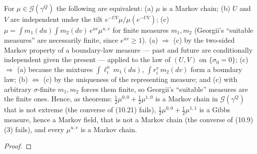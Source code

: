 \begin{corollary}[Georgii (11.33)]
    \label{cor:sc-11-33}
    \leanok

    For $\mu \in \mathcal G(\gamma^Q)$ the following are equivalent: (a) $\mu$ is a Markov chain;
    (b) $U$ and $V$ are independent under the tilt $e^{-UV}\mu/\mu(e^{-UV})$; (c)
    $\mu = \int m_1(du)\int m_2(dv)\,e^{uv}\mu^{u,v}$ for finite measures $m_1, m_2$ (Georgii's
    ``suitable measures'' are necessarily finite, since $e^{uv} \geq 1$). (a) $\Rightarrow$ (c) by
    the two-sided Markov property of a boundary-law measure --- past and future are conditionally
    independent given the present --- applied to the law of $(U,V)$ on $\{\sigma_0 = 0\}$;
    (c) $\Rightarrow$ (a) because the mixtures $\int \ell^u_i\,m_1(du)$, $\int r^v_i\,m_2(dv)$ form
    a boundary law; (b) $\Leftrightarrow$ (c) by the uniqueness of the representing measure; and
    (c) with arbitrary $\sigma$-finite $m_1, m_2$ forces them finite, so Georgii's ``suitable''
    measures are the finite ones. Hence, as theorems: $\tfrac12\mu^{0,0} + \tfrac12\mu^{1,0}$ is
    a Markov chain in $\mathcal G(\gamma^Q)$ that is not extreme (the converse of (10.21) fails),
    $\tfrac12\mu^{0,0} + \tfrac12\mu^{1,1}$ is a Gibbs measure, hence a Markov field, that is not
    a Markov chain (the converse of (10.9)(3) fails), and every $\mu^{u,v}$ is a Markov chain.
\end{corollary}
\begin{proof}
    \leanok
\end{proof}

